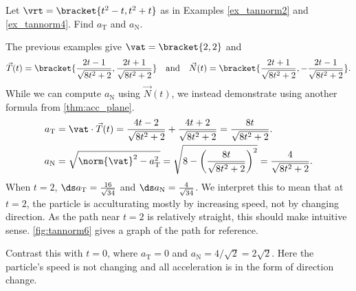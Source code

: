 {Let $\vrt=\bracket{t^2-t,t^2+t}$ as in Examples \ref{ex_tannorm2} and \ref{ex_tannorm4}. Find $a_\mathrm{T}$ and $a_\mathrm{N}$.}
{The previous examples give $\vat =\bracket{2,2}$ and
\[\vec T(t) =\bracket{\frac{2t-1}{\sqrt{8t^2+2}},\frac{2t+1}{\sqrt{8t^2+2}}}\quad \text{and}\quad \vec N(t) =\bracket{\frac{2t+1}{\sqrt{8t^2+2}},-\frac{2t-1}{\sqrt{8t^2+2}}}.\]
While we can compute $a_\mathrm{N}$ using $\vec N(t)$, we instead demonstrate using another formula from \autoref{thm:acc_plane}.
\begin{align*}
a_\mathrm{T} &= \vat\cdot\vec T(t) = \frac{4t-2}{\sqrt{8t^2+2}}+\frac{4t+2}{\sqrt{8t^2+2}} = \frac{8t}{\sqrt{8t^2+2}}.\\
a_\mathrm{N} &= \sqrt{\norm{\vat}^2-a_\mathrm{T}^2} = \sqrt{8-\left(\frac{8t}{\sqrt{8t^2+2}}\right)^2}=\frac{4}{\sqrt{8t^2+2}}.\medskip
\end{align*}
When $t=2$, $\ds a_{\mathrm{T}} = \frac{16}{\sqrt{34}}%
$ and $\ds a_{\mathrm{N}} = \frac{4}{\sqrt{34}}%
$. We interpret this to mean that at $t=2$, the particle is acculturating mostly by increasing speed, not by changing direction. As the path near $t=2$ is relatively straight, this should make intuitive sense. \autoref{fig:tannorm6} gives a graph of the path for reference.

Contrast this with $t=0$, where $a_{\mathrm{T}}=0$ and $a_{\mathrm{N}}=4/\sqrt2=2\sqrt2 %
$. Here the particle's speed is not changing and all acceleration is in the form of direction change.}

